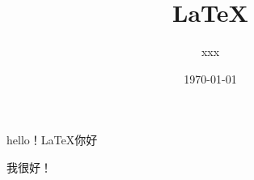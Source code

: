 \documentclass[UTF8]{ctexart}
\title{LaTeX}
\author{xxx}
\date{\today}
\begin{document}
hello！LaTeX你好

我很好！
\end{document}
